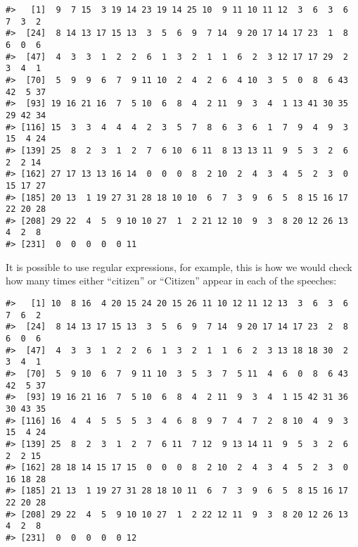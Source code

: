 \documentclass[]{book}
\newenvironment{Shaded}{\begin{snugshade}}{\end{snugshade}}
\newcommand{\CommentTok}[1]{\textcolor[rgb]{0.56,0.35,0.01}{\textit{#1}}}
\newcommand{\KeywordTok}[1]{\textcolor[rgb]{0.13,0.29,0.53}{\textbf{#1}}}
\newcommand{\NormalTok}[1]{#1}
\newcommand{\OperatorTok}[1]{\textcolor[rgb]{0.81,0.36,0.00}{\textbf{#1}}}
\newcommand{\StringTok}[1]{\textcolor[rgb]{0.31,0.60,0.02}{#1}}
\begin{document}
\begin{verbatim}
#>   [1]  9  7 15  3 19 14 23 19 14 25 10  9 11 10 11 12  3  6  3  6  7  3  2
#>  [24]  8 14 13 17 15 13  3  5  6  9  7 14  9 20 17 14 17 23  1  8  6  0  6
#>  [47]  4  3  3  1  2  2  6  1  3  2  1  1  6  2  3 12 17 17 29  2  3  4  1
#>  [70]  5  9  9  6  7  9 11 10  2  4  2  6  4 10  3  5  0  8  6 43 42  5 37
#>  [93] 19 16 21 16  7  5 10  6  8  4  2 11  9  3  4  1 13 41 30 35 29 42 34
#> [116] 15  3  3  4  4  4  2  3  5  7  8  6  3  6  1  7  9  4  9  3 15  4 24
#> [139] 25  8  2  3  1  2  7  6 10  6 11  8 13 13 11  9  5  3  2  6  2  2 14
#> [162] 27 17 13 13 16 14  0  0  0  8  2 10  2  4  3  4  5  2  3  0 15 17 27
#> [185] 20 13  1 19 27 31 28 18 10 10  6  7  3  9  6  5  8 15 16 17 22 20 28
#> [208] 29 22  4  5  9 10 10 27  1  2 21 12 10  9  3  8 20 12 26 13  4  2  8
#> [231]  0  0  0  0  0 11
\end{verbatim}

It is possible to use regular expressions, for example, this is how we would check how many times either ``citizen'' or ``Citizen'' appear in each of the speeches:

\begin{Shaded}
\end{Shaded}

\begin{verbatim}
#>   [1] 10  8 16  4 20 15 24 20 15 26 11 10 12 11 12 13  3  6  3  6  7  6  2
#>  [24]  8 14 13 17 15 13  3  5  6  9  7 14  9 20 17 14 17 23  2  8  6  0  6
#>  [47]  4  3  3  1  2  2  6  1  3  2  1  1  6  2  3 13 18 18 30  2  3  4  1
#>  [70]  5  9 10  6  7  9 11 10  3  5  3  7  5 11  4  6  0  8  6 43 42  5 37
#>  [93] 19 16 21 16  7  5 10  6  8  4  2 11  9  3  4  1 15 42 31 36 30 43 35
#> [116] 16  4  4  5  5  5  3  4  6  8  9  7  4  7  2  8 10  4  9  3 15  4 24
#> [139] 25  8  2  3  1  2  7  6 11  7 12  9 13 14 11  9  5  3  2  6  2  2 15
#> [162] 28 18 14 15 17 15  0  0  0  8  2 10  2  4  3  4  5  2  3  0 16 18 28
#> [185] 21 13  1 19 27 31 28 18 10 11  6  7  3  9  6  5  8 15 16 17 22 20 28
#> [208] 29 22  4  5  9 10 10 27  1  2 22 12 11  9  3  8 20 12 26 13  4  2  8
#> [231]  0  0  0  0  0 12
\end{verbatim}
\end{document}
